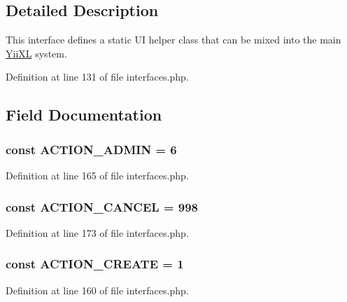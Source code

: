 \subsection{Detailed Description}
This interface defines a static UI helper class that can be mixed into the main \hyperlink{classYiiXL}{YiiXL} system. 

Definition at line 131 of file interfaces.php.



\subsection{Field Documentation}
\hypertarget{interfaceIXLUIHelper_a40afbdc229854c77e24353b459713784}{
\subsubsection[{ACTION\_\-ADMIN}]{\setlength{\rightskip}{0pt plus 5cm}const {\bf ACTION\_\-ADMIN} = 6}}
\label{interfaceIXLUIHelper_a40afbdc229854c77e24353b459713784}


Definition at line 165 of file interfaces.php.

\hypertarget{interfaceIXLUIHelper_a03e2e4af94065db773598c46a3d457f8}{
\subsubsection[{ACTION\_\-CANCEL}]{\setlength{\rightskip}{0pt plus 5cm}const {\bf ACTION\_\-CANCEL} = 998}}
\label{interfaceIXLUIHelper_a03e2e4af94065db773598c46a3d457f8}


Definition at line 173 of file interfaces.php.

\hypertarget{interfaceIXLUIHelper_a9c06ab2db927f3b687a12bf1bed808cd}{
\subsubsection[{ACTION\_\-CREATE}]{\setlength{\rightskip}{0pt plus 5cm}const {\bf ACTION\_\-CREATE} = 1}}
\label{interfaceIXLUIHelper_a9c06ab2db927f3b687a12bf1bed808cd}


Definition at line 160 of file interfaces.php.

